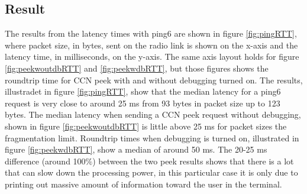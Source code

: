 \subsection{Result}

The results from the latency times with ping6 are shown in figure \ref{fig:pingRTT}, where packet size, in bytes, sent on the radio link is shown on the x-axis and the latency time, in milliseconds, on the y-axis. The same axis layout holds for figure \ref{fig:peekwoutdbRTT} and \ref{fig:peekwdbRTT}, but those figures shows the roundtrip time for CCN peek with and without debugging turned on. The results, illustradet in figure \ref{fig:pingRTT}, show that the median latency for a ping6 request is very close to around 25 ms from 93 bytes in packet size up to 123 bytes. The median latency when sending a CCN peek request without debugging, shown in figure \ref{fig:peekwoutdbRTT} is little above 25 ms for packet sizes the fragmentation limit. Roundtrip times when debugging is turned on, illustrated in figure \ref{fig:peekwdbRTT}, show a median of around 50 ms. The 20-25 ms difference (around 100$\%$) between the two peek results shows that there is a lot that can slow down the processing power, in this particular case it is only due to printing out massive amount of information toward the user in the terminal.\\\\
